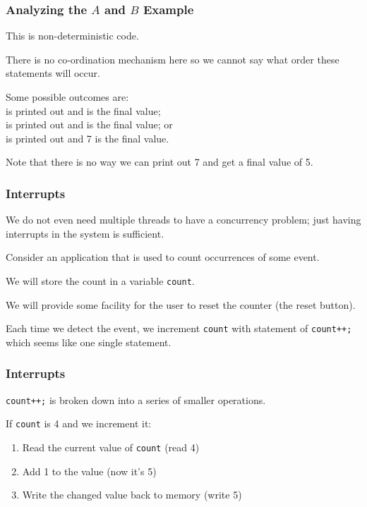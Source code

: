 \begin{frame}
	\frametitle{Analyzing the $A$ and $B$ Example}

	This is non-deterministic code.

	There is no co-ordination mechanism here so we cannot say what order these statements will occur.

	Some possible outcomes are:\\
	 is printed out and is the final value;\\
	 is printed out and is the final value; or\\
	 is printed out and 7 is the final value.

	Note that there is no way we can print out 7 and get a final value of 5.


\end{frame}

\begin{frame}
	\frametitle{Interrupts}

	We do not even need multiple threads to have a concurrency problem; just having interrupts in the system is sufficient.

	Consider an application that is used to count occurrences of some event.

	We will store the count in a variable \texttt{count}.

	We will provide some facility for the user to reset the counter (the reset button).

	Each time we detect the event, we increment \texttt{count} with statement of \texttt{count++;} which seems like one single statement.



\end{frame}

\begin{frame}
	\frametitle{Interrupts}

	\texttt{count++;} is broken down into a series of smaller operations.

	If \texttt{count} is 4 and we increment it:

	\begin{enumerate}
		\item Read the current value of \texttt{count} (read 4)
		\item Add 1 to the value (now it's 5)
		\item Write the changed value back to memory (write 5)
	\end{enumerate}


\end{frame}

